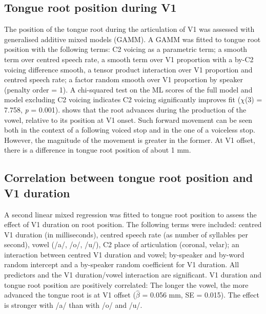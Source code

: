 \documentclass[12pt,]{article}
\begin{document}
\hypertarget{tongue-root-position-during-v1}{%
\subsection{Tongue root position during
V1}\label{tongue-root-position-during-v1}}

The position of the tongue root during the articulation of V1 was
assessed with generalised additive mixed models (GAMM). A GAMM was
fitted to tongue root position with the following terms: C2 voicing as a
parametric term; a smooth term over centred speech rate, a smooth term
over V1 proportion with a by-C2 voicing difference smooth, a tensor
product interaction over V1 proportion and centred speech rate; a factor
random smooth over V1 proportion by speaker (penalty order = 1). A
chi-squared test on the ML scores of the full model and model excluding
C2 voicing indicates C2 voicing significantly improves fit (\(\chi\)(3)
= 7.758, \emph{p} = 0.001).  shows that the root
advances during the production of the vowel, relative to its position at
V1 onset. Such forward movement can be seen both in the context of a
following voiced stop and in the one of a voiceless stop. However, the
magnitude of the movement is greater in the former. At V1 offset, there
is a difference in tongue root position of about 1 mm.

\hypertarget{correlation-between-tongue-root-position-and-v1-duration}{%
\subsection{Correlation between tongue root position and V1
duration}\label{correlation-between-tongue-root-position-and-v1-duration}}

A second linear mixed regression was fitted to tongue root position to
assess the effect of V1 duration on root position. The following terms
were included: centred V1 duration (in milliseconds), centred speech
rate (as number of syllables per second), vowel (/a/, /o/, /u/), C2
place of articulation (coronal, velar); an interaction between centred
V1 duration and vowel; by-speaker and by-word random intercept and a
by-speaker random coefficient for V1 duration. All predictors and the V1
duration/vowel interaction are significant. V1 duration and tongue root
position are positively correlated: The longer the vowel, the more
advanced the tongue root is at V1 offset (\(\hat{\beta}\) = 0.056 mm, SE
= 0.015). The effect is stronger with /a/ than with /o/ and /u/.
\end{document}
